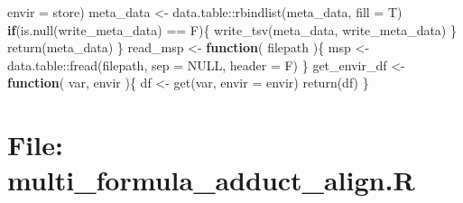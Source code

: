 \documentclass[
]{article}
\newenvironment{Shaded}{\begin{snugshade}}{\end{snugshade}}
\newcommand{\AttributeTok}[1]{\textcolor[rgb]{0.77,0.63,0.00}{#1}}
\newcommand{\ConstantTok}[1]{\textcolor[rgb]{0.00,0.00,0.00}{#1}}
\newcommand{\ControlFlowTok}[1]{\textcolor[rgb]{0.13,0.29,0.53}{\textbf{#1}}}
\newcommand{\FunctionTok}[1]{\textcolor[rgb]{0.00,0.00,0.00}{#1}}
\newcommand{\NormalTok}[1]{#1}
\newcommand{\OtherTok}[1]{\textcolor[rgb]{0.56,0.35,0.01}{#1}}
\newcommand{\SpecialCharTok}[1]{\textcolor[rgb]{0.00,0.00,0.00}{#1}}
\begin{document}
\begin{Shaded}
\begin{Highlighting}[]
                        \AttributeTok{envir =}\NormalTok{ store)}
\NormalTok{    meta\_data }\OtherTok{\textless{}{-}}\NormalTok{ data.table}\SpecialCharTok{::}\FunctionTok{rbindlist}\NormalTok{(meta\_data, }\AttributeTok{fill =}\NormalTok{ T)}
    \ControlFlowTok{if}\NormalTok{(}\FunctionTok{is.null}\NormalTok{(write\_meta\_data) }\SpecialCharTok{==}\NormalTok{ F)\{}
      \FunctionTok{write\_tsv}\NormalTok{(meta\_data, write\_meta\_data)}
\NormalTok{    \}}
    \FunctionTok{return}\NormalTok{(meta\_data)}
\NormalTok{  \}}
\NormalTok{read\_msp }\OtherTok{\textless{}{-}}
  \ControlFlowTok{function}\NormalTok{(}
\NormalTok{           filepath}
\NormalTok{           )\{}
\NormalTok{    msp }\OtherTok{\textless{}{-}}\NormalTok{ data.table}\SpecialCharTok{::}\FunctionTok{fread}\NormalTok{(filepath, }\AttributeTok{sep =} \ConstantTok{NULL}\NormalTok{, }\AttributeTok{header =}\NormalTok{ F)}
\NormalTok{  \}}
\NormalTok{get\_envir\_df }\OtherTok{\textless{}{-}}
  \ControlFlowTok{function}\NormalTok{(}
\NormalTok{           var,}
\NormalTok{           envir}
\NormalTok{           )\{}
\NormalTok{    df }\OtherTok{\textless{}{-}} \FunctionTok{get}\NormalTok{(var, }\AttributeTok{envir =}\NormalTok{ envir)}
    \FunctionTok{return}\NormalTok{(df)}
\NormalTok{  \}}
\end{Highlighting}
\end{Shaded}

\hypertarget{file-multi_formula_adduct_align.r}{%
\section{File: multi\_formula\_adduct\_align.R}\label{file-multi_formula_adduct_align.r}}
\end{document}
